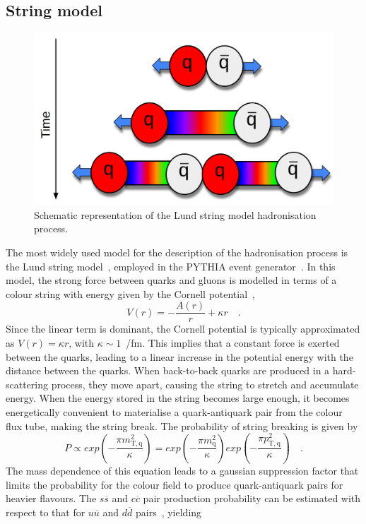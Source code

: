 \subsection{String model}
\begin{figure}[htb]
    \centering
    \includegraphics[width=0.7\linewidth]{Figures/Chapter 2/Lund.png}
    \caption{Schematic representation of the Lund string model hadronisation process.}
    \label{fig:Lund}
\end{figure}
The most widely used model for the description of the hadronisation process is the Lund string model~\cite{Andersson:1983ia}, employed in the PYTHIA event generator~\cite{Bierlich:2022pfr}. In this model, the strong force between quarks and gluons is modelled in terms of a colour string with energy given by the Cornell potential~\cite{Eichten:1974af},
\begin{equation*}
    V(r) = -\frac{A(r)}{r} + \kappa r\quad .
\end{equation*}
Since the linear term is dominant, the Cornell potential is typically approximated as $V(r) = \kappa r$, with $\kappa\sim1$~\gev/fm. This implies that a constant force is exerted between the quarks, leading to a linear increase in the potential energy with the distance between the quarks. When back-to-back quarks are produced in a hard-scattering process, they move apart, causing the string to stretch and accumulate energy. When the energy stored in the string becomes large enough, it becomes energetically convenient to materialise a quark-antiquark pair from the colour flux tube, making the string break. The probability of string breaking is given by
\begin{equation*}
    P \propto exp\left(-\frac{\pi m_\mathrm{T,q}^2}{\kappa}\right) = exp\left(-\frac{\pi m_\mathrm{q}^2}{\kappa}\right) exp\left(-\frac{\pi p_\mathrm{T,q}^2}{\kappa}\right)\quad .
\end{equation*}
The mass dependence of this equation leads to a gaussian suppression factor that limits the probability for the colour field to produce quark-antiquark pairs for heavier flavours. The $s\overline{s}$ and $c\overline{c}$ pair production probability can be estimated with respect to that for $u\overline{u}$ and $d\overline{d}$ pairs~\cite{Ferreres-Sole:2018vgo}, yielding
